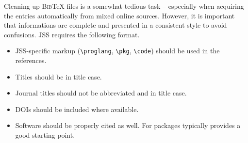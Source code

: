 \documentclass[article]{jss}
\begin{document}
\begin{appendix}
\begin{leftbar}
Cleaning up \textsc{Bib}{\TeX} files is a somewhat tedious task -- especially
when acquiring the entries automatically from mixed online sources. However,
it is important that informations are complete and presented in a consistent
style to avoid confusions. JSS requires the following format.
\begin{itemize}
  \item JSS-specific markup (\verb|\proglang|, \verb|\pkg|, \verb|\code|) should
    be used in the references.
  \item Titles should be in title case.
  \item Journal titles should not be abbreviated and in title case.
  \item DOIs should be included where available.
  \item Software should be properly cited as well. For  packages
     typically provides a good starting point.
\end{itemize}
\end{leftbar}

\end{appendix}

\end{document}
